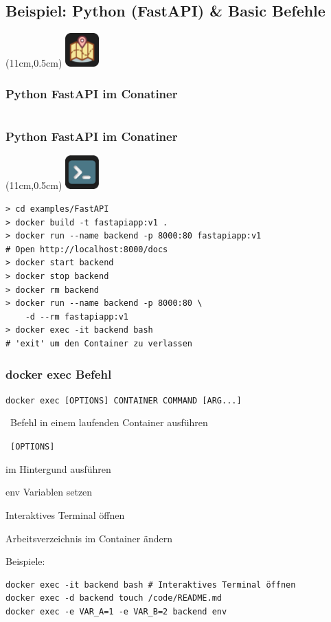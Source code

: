 \documentclass[22pt]{beamer}
\newcommand{\code}[1]{\colorbox{gray!15}{\texttt{#1}}}
\newcommand{\desclabel}[1]{\textcolor{cyan}{#1}}
\newcommand{\codeTour}{
    \begin{textblock*}{1.3cm}(11cm,0.5cm) %
    \includegraphics[width=1.3cm]{Bilder/CodeTour.png}
    \end{textblock*}
}
\newcommand{\terminal}{
    \begin{textblock*}{1.3cm}(11cm,0.5cm) %
    \includegraphics[width=1.3cm]{Bilder/terminal2.png}
    \end{textblock*}
}
\begin{document}
\subsection{Beispiel: Python (FastAPI) \& Basic Befehle}
\begin{frame}[fragile]
    \codeTour
    \frametitle{Python FastAPI im Conatiner}

    \inputminted[fontsize=\footnotesize, frame=lines]{dockerfile}{../examples/FastAPI/Dockerfile}
\end{frame}

\begin{frame}[fragile]
    \frametitle{Python FastAPI im Conatiner}
    \terminal
\begin{verbatim}
> cd examples/FastAPI
> docker build -t fastapiapp:v1 .
> docker run --name backend -p 8000:80 fastapiapp:v1
# Open http://localhost:8000/docs
> docker start backend
> docker stop backend
> docker rm backend
> docker run --name backend -p 8000:80 \
    -d --rm fastapiapp:v1
> docker exec -it backend bash
# 'exit' um den Container zu verlassen
\end{verbatim}
\end{frame}

\begin{frame}[fragile]
    \frametitle{docker exec Befehl}
    \code{docker exec [OPTIONS] CONTAINER COMMAND [ARG...]}

    \-  \ Befehl in einem laufenden Container ausführen\vspace{5pt}

    \-  \ \code{[OPTIONS]}
    \begin{description}[labelindent=0.5cm, style=unboxed, labelwidth=\widthof{bla}, leftmargin=!]
        \item[\desclabel{-d}] im Hintergund ausführen
        \item[\desclabel{-e}] env Variablen setzen
        \item[\desclabel{-it}] Interaktives Terminal öffnen
        \item[\desclabel{-w, -\,-workdir string}] Arbeitsverzeichnis im Container ändern
        \item[...] 
    \end{description}

    Beispiele:
\begin{verbatim}
docker exec -it backend bash # Interaktives Terminal öffnen
docker exec -d backend touch /code/README.md
docker exec -e VAR_A=1 -e VAR_B=2 backend env
\end{verbatim}
    
\end{frame}
\end{document}
